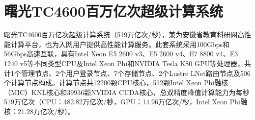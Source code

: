 \documentclass[a4paper,12pt,english]{sphinxmanual}
\begin{document}
\section{曙光TC4600百万亿次超级计算系统}
\label{\detokenize{introduction/tc4600-introduction:tc4600}}\label{\detokenize{introduction/tc4600-introduction::doc}}
\sphinxAtStartPar
曙光TC4600百万亿次超级计算系统（519万亿次/秒），兼为安徽省教育科研网高性能计算平台，也为入网用户提供高性能计算服务。此套系统采用100Gbps和56Gbps高速互联，具有Intel Xeon E5 2600 v3、E5 2600 v4、E7 8800 v4、E3 1240 v5等不同类型CPU及Intel Xeon Phi和NVIDIA Tesla K80 GPU等处理器，共计1个管理节点、2个用户登录节点、7个存储节点、2个Lustre LNet路由节点及506个计算节点构成。计算节点共12200颗CPU核心，512颗Intel Xeon Phi融核（MIC）KNL核心和39936颗NVIDIA CUDA核心，总双精度峰值计算能力为每秒519万亿次（CPU：482.82万亿次/秒，GPU：14.96万亿次/秒，Intel Xeon Phi融核：21.28万亿次/秒）。
\end{document}
